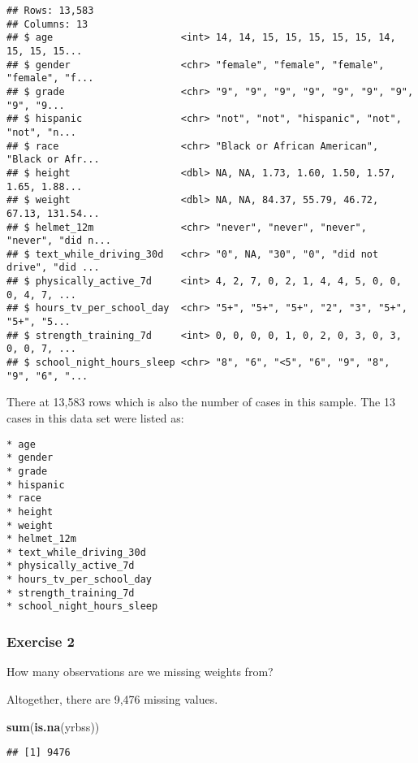 \documentclass[
]{article}
\newenvironment{Shaded}{\begin{snugshade}}{\end{snugshade}}
\newcommand{\KeywordTok}[1]{\textcolor[rgb]{0.13,0.29,0.53}{\textbf{#1}}}
\newcommand{\NormalTok}[1]{#1}
\begin{document}
\begin{verbatim}
## Rows: 13,583
## Columns: 13
## $ age                      <int> 14, 14, 15, 15, 15, 15, 15, 14, 15, 15, 15...
## $ gender                   <chr> "female", "female", "female", "female", "f...
## $ grade                    <chr> "9", "9", "9", "9", "9", "9", "9", "9", "9...
## $ hispanic                 <chr> "not", "not", "hispanic", "not", "not", "n...
## $ race                     <chr> "Black or African American", "Black or Afr...
## $ height                   <dbl> NA, NA, 1.73, 1.60, 1.50, 1.57, 1.65, 1.88...
## $ weight                   <dbl> NA, NA, 84.37, 55.79, 46.72, 67.13, 131.54...
## $ helmet_12m               <chr> "never", "never", "never", "never", "did n...
## $ text_while_driving_30d   <chr> "0", NA, "30", "0", "did not drive", "did ...
## $ physically_active_7d     <int> 4, 2, 7, 0, 2, 1, 4, 4, 5, 0, 0, 0, 4, 7, ...
## $ hours_tv_per_school_day  <chr> "5+", "5+", "5+", "2", "3", "5+", "5+", "5...
## $ strength_training_7d     <int> 0, 0, 0, 0, 1, 0, 2, 0, 3, 0, 3, 0, 0, 7, ...
## $ school_night_hours_sleep <chr> "8", "6", "<5", "6", "9", "8", "9", "6", "...
\end{verbatim}

There at 13,583 rows which is also the number of cases in this sample.
The 13 cases in this data set were listed as:

\begin{verbatim}
* age
* gender
* grade
* hispanic
* race
* height
* weight
* helmet_12m
* text_while_driving_30d
* physically_active_7d 
* hours_tv_per_school_day
* strength_training_7d
* school_night_hours_sleep 
\end{verbatim}

\hypertarget{exercise-2}{%
\subsubsection{Exercise 2}\label{exercise-2}}

How many observations are we missing weights from?

Altogether, there are 9,476 missing values.

\begin{Shaded}
\begin{Highlighting}[]
\KeywordTok{sum}\NormalTok{(}\KeywordTok{is.na}\NormalTok{(yrbss))}
\end{Highlighting}
\end{Shaded}

\begin{verbatim}
## [1] 9476
\end{verbatim}
\end{document}
